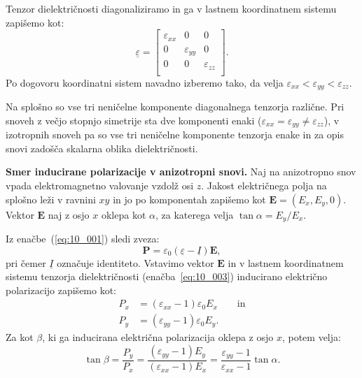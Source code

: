 Tenzor dielektričnosti diagonaliziramo in ga v lastnem koordinatnem 
sistemu zapišemo kot:
\begin{equation}
\underline{\varepsilon} = 
\left[\begin{array}{ccc}
\varepsilon_{xx} & 0 & 0\\
0 & \varepsilon_{yy} &0\\
0 & 0 & \varepsilon_{zz}\\
\end{array}\right]\!\!.
\label{eq:10_003}
\end{equation}
Po dogovoru koordinatni sistem navadno izberemo tako, da velja 
$\varepsilon_{xx}<\varepsilon_{yy}<\varepsilon_{zz}$.

Na splošno so vse tri neničelne komponente diagonalnega tenzorja različne. 
Pri snoveh z večjo stopnjo simetrije sta dve komponenti enaki ($\varepsilon_{xx} = 
\varepsilon_{yy} \neq \varepsilon_{zz}$), v izotropnih snoveh pa so vse tri 
neničelne komponente tenzorja enake in za opis snovi zadošča skalarna oblika dielektričnosti.

\begin{example}{\bf Smer inducirane polarizacije v anizotropni snovi.}
Naj na anizotropno snov vpada elektromagnetno valovanje vzdolž osi $z$. Jakost
elek\-trič\-ne\-ga polja na splošno leži v ravnini $xy$ in jo po komponentah
zapišemo kot $\mathbf{E} = (E_x, E_y, 0)$. Vektor $\mathbf{E}$ naj z osjo $x$
oklepa kot $\alpha$, za katerega velja $\tan \alpha  = E_y/E_x$.

Iz enačbe~(\ref{eq:10_001}) sledi zveza:
\begin{equation}
\mathbf{P} = \varepsilon_0 \left(\underline{\varepsilon} - \underline{I}\right)\mathbf{E},
\label{eq:10_004}
\end{equation}
pri čemer $\underline{I}$ označuje identiteto.
Vstavimo vektor $\mathbf{E}$ in v lastnem koordinatnem sistemu tenzorja 
dielektričnosti (enačba~\ref{eq:10_003}) inducirano električno polarizacijo zapišemo kot:
\begin{align}
P_x &= (\varepsilon_{xx}-1) \varepsilon_0 E_x \qquad \mathrm{in} \label{eq:10_005}\\
P_y &= (\varepsilon_{yy}-1) \varepsilon_0 E_y.
\label{eq:10_006}
\end{align}
Za kot $\beta$, ki ga inducirana električna polarizacija oklepa z osjo $x$, potem velja:
\begin{equation}
\tan \beta = \frac{P_y}{P_x} = \frac{(\varepsilon_{yy}-1)E_y}{(\varepsilon_{xx}-1)E_x}
 = \frac{\varepsilon_{yy}-1}{\varepsilon_{xx}-1}\tan \alpha.
\end{equation}
\end{example}

